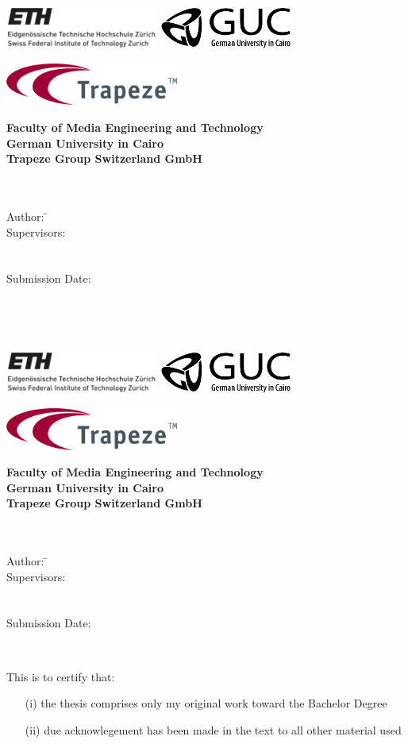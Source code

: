 \newcommand{\titlePage}{

\thispagestyle{empty}
\begin{center}
	\includegraphics[height=1.4cm]{images/eth.png} \hfill \includegraphics[height=1.4cm]{images/gucblack.png}\\[1mm]
	\begin{center}
		\includegraphics[height=1.4cm]{images/trapeze_logo.png}\\[10mm]
	\end{center}
	\textbf{Faculty of Media Engineering and Technology}\\[1mm]
	\textbf{German University in Cairo}\\[1mm]
	\textbf{Trapeze Group Switzerland GmbH}\\[1mm]
	
	
	
	\vspace{2cm}
	\doublespacing
	{\Huge \textbf{\titleOfThesisOne}}\\
	\singlespacing
	\vspace{2cm}
	{\large \textbf{\typeOfThesis}}\\
	
	\vfill
	\parbox{1cm}{
  		\begin{large}
    			\begin{tabbing}
       			Author: \hspace{2cm}  
        			\=\authorOfThesis\\[2mm]
      			Supervisors: 
        			\>\supervisorOne\\[2mm]
				\>\supervisorTwo\\[2mm]
				\>\supervisorThree\\[2mm]
      			Submission Date: 
        			\>\submissionDate\\
    			\end{tabbing}
  		\end{large}
	}\\
\end{center}
\clearpage
}
\titlePage
\thispagestyle{empty}\ \clearpage
\titlePage
\thispagestyle{empty}
This is to certify that:
\begin{itemize}
\item[(i)] the thesis comprises only my original work toward the Bachelor Degree
\item[(ii)] due acknowlegement has been made in the text to all other material used
\end{itemize}


